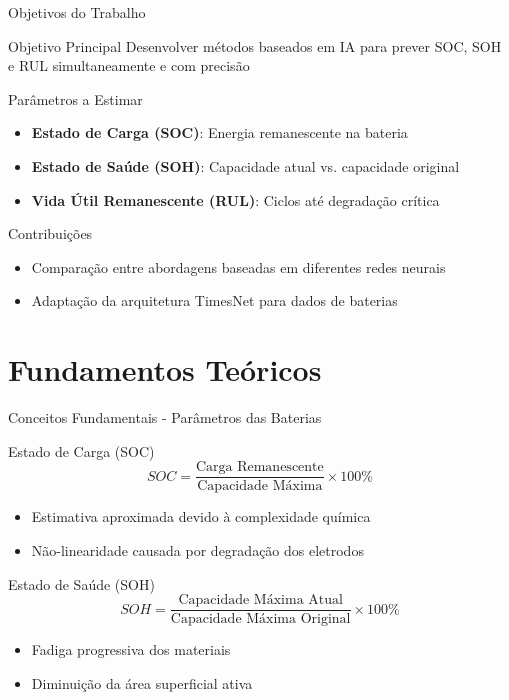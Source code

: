 \documentclass[aspectratio=169,xcolor=dvipsnames]{beamer}
\begin{document}
\begin{frame}{Objetivos do Trabalho}
  \begin{block}{Objetivo Principal}
    Desenvolver métodos baseados em IA para prever SOC, SOH e RUL simultaneamente e com precisão
  \end{block}
  
  \vspace{0.3cm}
  
  \begin{block}{Parâmetros a Estimar}
    \begin{itemize}
      \item \textbf{Estado de Carga (SOC)}: Energia remanescente na bateria
      \item \textbf{Estado de Saúde (SOH)}: Capacidade atual vs. capacidade original
      \item \textbf{Vida Útil Remanescente (RUL)}: Ciclos até degradação crítica
    \end{itemize}
  \end{block}
  
  \begin{exampleblock}{Contribuições}
    \begin{itemize}
      \item Comparação entre abordagens baseadas em diferentes redes neurais
      \item Adaptação da arquitetura TimesNet para dados de baterias
    \end{itemize}
  \end{exampleblock}
\end{frame}

\section{Fundamentos Teóricos}
\begin{frame}{Conceitos Fundamentais - Parâmetros das Baterias}
  \begin{block}{Estado de Carga (SOC)}
    $$SOC = \frac{\text{Carga Remanescente}}{\text{Capacidade Máxima}} \times 100\%$$
    \begin{itemize}
      \item Estimativa aproximada devido à complexidade química
      \item Não-linearidade causada por degradação dos eletrodos
    \end{itemize}
  \end{block}
  
  \begin{block}{Estado de Saúde (SOH)}
    $$SOH = \frac{\text{Capacidade Máxima Atual}}{\text{Capacidade Máxima Original}} \times 100\%$$
    \begin{itemize}
      \item Fadiga progressiva dos materiais
      \item Diminuição da área superficial ativa
    \end{itemize}
  \end{block}
\end{frame}
\end{document}
